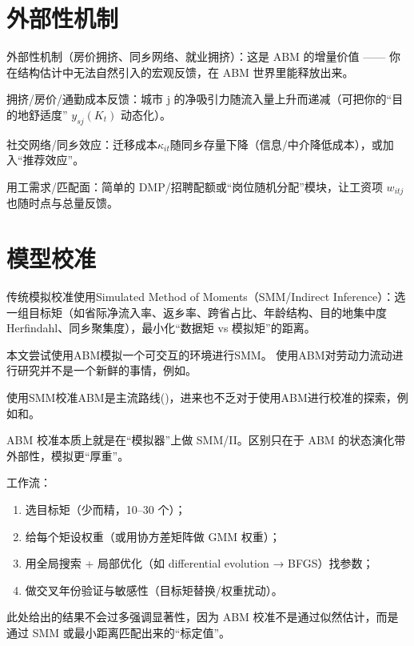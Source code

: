 \documentclass[master, final]{zufe-thesis}
\begin{document}
\section{外部性机制} %
\label{sec:外部性机制}

外部性机制（房价拥挤、同乡网络、就业拥挤）：这是 ABM 的增量价值 —— 你在结构估计中无法自然引入的宏观反馈，在 ABM 世界里能释放出来。

拥挤/房价/通勤成本反馈：城市 j 的净吸引力随流入量上升而递减（可把你的“目的地舒适度” $y_{sj}(K_t)$ 动态化）。

社交网络/同乡效应：迁移成本$\kappa_{it}$随同乡存量下降（信息/中介降低成本），或加入“推荐效应”。

用工需求/匹配面：简单的 DMP/招聘配额或“岗位随机分配”模块，让工资项 $w_{itj}$ 也随时点与总量反馈。



\section{模型校准} %
\label{sub:模型校准}


传统模拟校准使用Simulated Method of Moments（SMM/Indirect Inference）：选一组目标矩（如省际净流入率、返乡率、跨省占比、年龄结构、目的地集中度 Herfindahl、同乡聚集度），最小化“数据矩 vs 模拟矩”的距离。

本文尝试使用ABM模拟一个可交互的环境进行SMM。
使用ABM对劳动力流动进行研究并不是一个新鲜的事情，例如\textcite{fuAgentBasedModelingChinas2018,klabundeDecisionmakingAgentbasedModels2016}。

使用SMM校准ABM是主流路线(\textcite{plattComparisonEconomicAgentbased2020})，进来也不乏对于使用ABM进行校准的探索，例如\textcite{rahmandadUsingMethodSimulated2015}和\textcite{pietzschMetamodelsEvaluatingCalibrating2020}。

ABM 校准本质上就是在“模拟器”上做 SMM/II。区别只在于 ABM 的状态演化带外部性，模拟更“厚重”。

工作流：
\begin{enumerate}
\item 选目标矩（少而精，10–30 个）；
\item 给每个矩设权重（或用协方差矩阵做 GMM 权重）；
\item 用全局搜索 + 局部优化（如 differential evolution → BFGS）找参数；
\item 做交叉年份验证与敏感性（目标矩替换/权重扰动）。
\end{enumerate}


此处给出的结果不会过多强调显著性，因为 ABM 校准不是通过似然估计，而是通过 SMM 或最小距离匹配出来的“标定值”。
\end{document}
